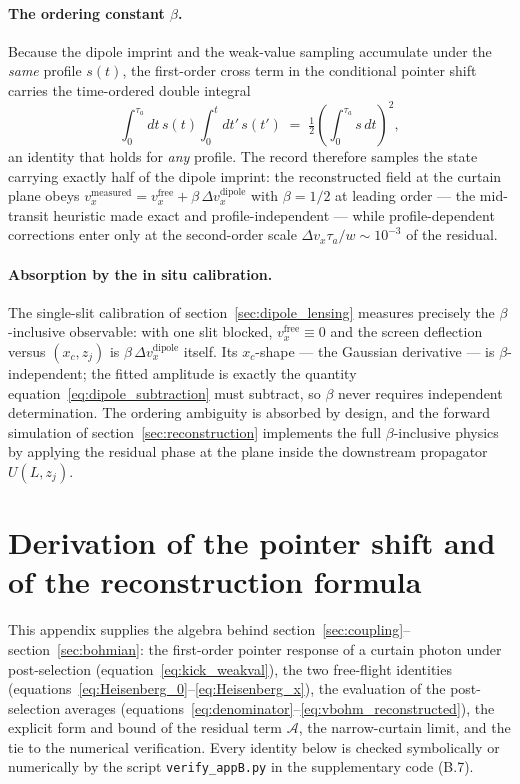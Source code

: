 \documentclass[11pt,a4paper]{article}
\begin{document}
\paragraph{The ordering constant $\beta$.} Because the dipole imprint and the weak-value sampling accumulate under the \emph{same} profile $s(t)$, the first-order cross term in the conditional pointer shift carries the time-ordered double integral
\begin{equation}
\int_0^{\tau_a}\! dt\, s(t)\int_0^{t}\! dt'\, s(t') \;=\; \tfrac{1}{2}\left(\int_0^{\tau_a}\! s\,dt\right)^{\!2},
\label{eq:appA_half}
\end{equation}
an identity that holds for \emph{any} profile. The record therefore samples the state carrying exactly half of the dipole imprint: the reconstructed field at the curtain plane obeys $v_x^\text{measured} = v_x^\text{free} + \beta\,\Delta v_x^\text{dipole}$ with $\beta = 1/2$ at leading order --- the mid-transit heuristic made exact and profile-independent --- while profile-dependent corrections enter only at the second-order scale $\Delta v_x\tau_a/w \sim 10^{-3}$ of the residual.

\paragraph{Absorption by the in situ calibration.} The single-slit calibration of section~\ref{sec:dipole_lensing} measures precisely the $\beta$-inclusive observable: with one slit blocked, $v_x^\text{free} \equiv 0$ and the screen deflection versus $(x_c, z_j)$ is $\beta\,\Delta v_x^\text{dipole}$ itself. Its $x_c$-shape --- the Gaussian derivative --- is $\beta$-independent; the fitted amplitude is exactly the quantity equation~\eqref{eq:dipole_subtraction} must subtract, so $\beta$ never requires independent determination. The ordering ambiguity is absorbed by design, and the forward simulation of section~\ref{sec:reconstruction} implements the full $\beta$-inclusive physics by applying the residual phase at the plane inside the downstream propagator $U(L, z_j)$.

\section{Derivation of the pointer shift and of the reconstruction formula}
\label{app:derivation}

This appendix supplies the algebra behind section~\ref{sec:coupling}--section~\ref{sec:bohmian}: the first-order pointer response of a curtain photon under post-selection (equation~\eqref{eq:kick_weakval}), the two free-flight identities (equations~\eqref{eq:Heisenberg_0}--\eqref{eq:Heisenberg_x}), the evaluation of the post-selection averages (equations~\eqref{eq:denominator}--\eqref{eq:vbohm_reconstructed}), the explicit form and bound of the residual term $\mathcal{A}$, the narrow-curtain limit, and the tie to the numerical verification. Every identity below is checked symbolically or numerically by the script \texttt{verify\_appB.py} in the supplementary code (B.7).
\end{document}
